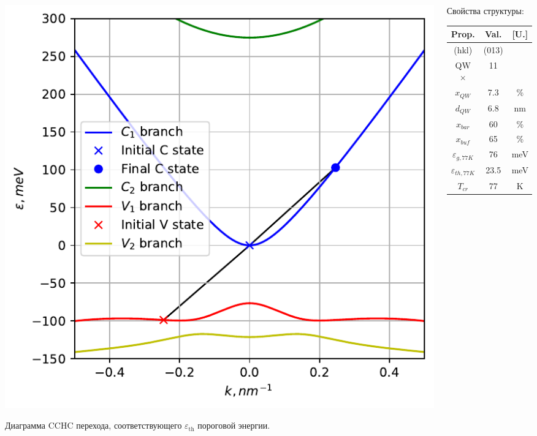 \documentclass[9pt,pdf]{beamer}
\begin{document}
\begin{frame}
\begin{columns}
\begin{column}{0.7\textwidth}
\begin{overprint}
                    \begin{center}
                        \includegraphics[width=1\textwidth]{images/22um_spec.pdf}
                    \end{center}
                    Диаграмма CCHC перехода, соответствующего $\varepsilon_\text{th}$ 
                    пороговой энергии.
                \end{overprint}
            \end{column}
            \hfill
            \begin{column}{0.3\textwidth}
                Свойства структуры:
                \begin{center}
                    \begin{tabular}{c | c c}
                        Prop.   & Val.  & [U.]\\
                        \hline
                        (hkl)       &  (013)    &\\
                        QW $\times$ &   11      &\\
                        $x_{QW}$    & 7.3   & \%\\
                        $d_{QW}$    & 6.8  & nm\\
                        $x_{bar}$  & 60   & \%\\
                        $x_{buf}$  & 65   & \%\\
                        $\varepsilon_{g, 77K}$ & 76 & meV\\
                        $\varepsilon_{th, 77K}$  & 23.5 & meV\\
                        $T_{cr}$       & 77 & K
                    \end{tabular}
                \end{center}
            \end{column}
        \end{columns}
    \end{frame}
\end{document}
